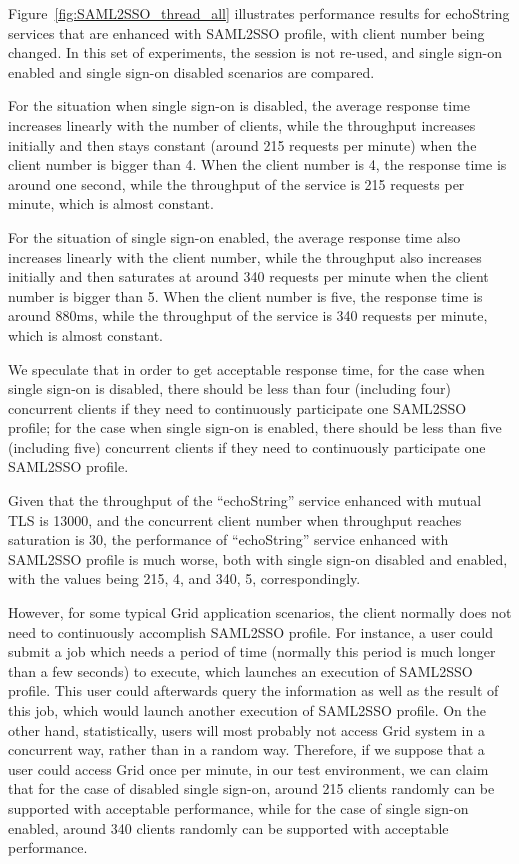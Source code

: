 \documentclass[conference]{IEEEtran}
\begin{document}
Figure~\ref{fig:SAML2SSO_thread_all} illustrates performance results for
echoString services that are enhanced with SAML2SSO profile, with client number being changed. In
this set of experiments, the session is not re-used, and single sign-on enabled and single sign-on
disabled scenarios are compared. 

For the situation when single sign-on is disabled, the average response time 
increases linearly with the number of clients, while the throughput increases initially and then 
stays constant (around 215 requests per minute) when the client number is bigger 
than 4. When the client number is 4, the response time is around one second, while the 
throughput of the service is 215 requests per minute, which is almost constant.

For the situation of single sign-on enabled, the average response time 
also increases linearly with the client number, while the throughput also increases initially and then 
saturates at around 340 requests per minute when the client number is bigger 
than 5. When the client number is five, the response time is around 880ms, while the 
throughput of the service is 340 requests per minute, which is almost constant.

We speculate that in order to get acceptable response time, for the case when single sign-on is disabled, 
there should be less than four (including four) concurrent clients if they need to continuously 
participate one SAML2SSO profile; for the case when single sign-on is enabled, 
there should be less than five (including five) concurrent clients if they need to continuously 
participate one SAML2SSO profile.

Given that the throughput of the ``echoString'' service enhanced with mutual
TLS is 13000, and the concurrent client number when throughput reaches saturation is 30, the
performance of ``echoString'' service enhanced with SAML2SSO profile is much worse, both 
with single sign-on disabled and enabled, with the values being 215, 4, and 340, 5, correspondingly.

However, for some typical Grid application scenarios, the client normally does
not need to continuously accomplish SAML2SSO profile. For instance, a user could submit a
job which needs a period of time (normally this period is much longer than a few
seconds) to execute, which launches an execution of SAML2SSO profile. 
This user could afterwards query the information as well as the result of
this job, which would launch another execution of SAML2SSO profile. On the other hand,
statistically, users will most probably not access Grid system in a concurrent way, rather than in a random way.
Therefore, if we suppose that a user could access Grid once per minute, in our test environment, we
can claim that for the case of disabled single sign-on, around 215 clients randomly can be 
supported with acceptable performance, while for the case of single sign-on enabled, around 340 
clients randomly can be supported with acceptable performance.
\end{document}
